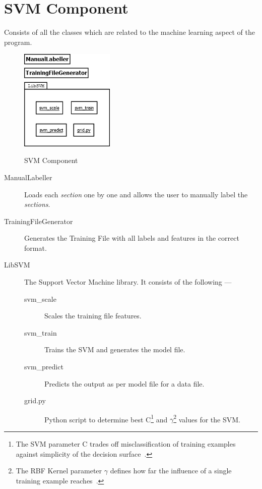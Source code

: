 \documentclass[a4paper,10pt]{report}
\begin{document}
\clearpage


\section{SVM Component}

Consists of all the classes which are related to the machine learning aspect of the program. \\

\begin{figure}[h!]
\centering
\includegraphics[width=0.40\textwidth]{./diagrams/SVM}\\
\caption{SVM Component}
\end{figure}

\begin{description}
	\item[ManualLabeller] Loads each \emph{section} one by one and allows the user to manually label the \emph{sections}.
    \item[TrainingFileGenerator] Generates the Training File with all labels and features in the correct format.
	\item[LibSVM] The Support Vector Machine library. It consists of the following ---
\begin{description}
        \item[svm\_scale] Scales the training file features.
        \item[svm\_train] Trains the SVM and generates the model file.
        \item[svm\_predict] Predicts the output as per model file for a data file.
        \item[grid.py] Python script to determine best C\footnote{The SVM parameter C trades off misclassification of training examples against simplicity of the decision surface~\cite{params}.} and $\gamma$\footnote{The RBF Kernel parameter $\gamma$ defines how far the influence of a single training example reaches~\cite{params}.} values for the SVM.
    \end{description}
\end{description}
\end{document}

